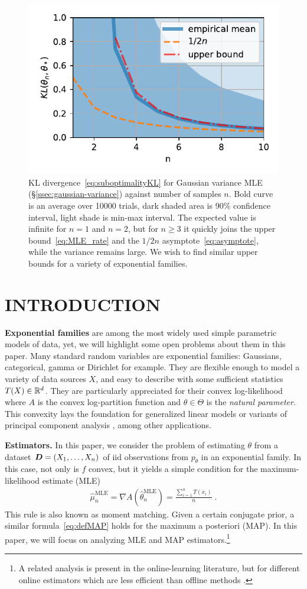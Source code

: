 \documentclass[twoside]{article}
\let\oldsection\section
\renewcommand{\section}[1]{\oldsection{\texorpdfstring{\uppercase{#1}}{#1}}}
\newcommand{\logpart}{A}
\newcommand{\nat}{\theta}
\newcommand{\lin}[1]{\left\langle#1\right\rangle}
\begin{document}
\begin{figure}[t]
	\centering
\includegraphics[width=.4\textwidth]{fewsamples.pdf}
	\caption{KL divergence~\eqref{eq:suboptimalityKL} for Gaussian variance MLE (\S\ref{ssec:gaussian-variance}) against number of samples $n$. Bold curve is an average over 10000 trials,  dark shaded area is 90\% confidence interval, light shade is min-max interval.
		The expected value is infinite for $n=1$ and $n=2$, but for $n\geq3$ it quickly joins the upper bound~\eqref{eq:MLE_rate} and the $1/2n$ asymptote~\eqref{eq:asymptote}, while the variance remains large.
		We wish to find similar upper bounds for a variety of exponential families.
	}
	\label{fig:curves}
\end{figure}


\section{Introduction}
\label{sec:motivation}

{\bf Exponential families} are among the most widely used simple parametric models of data, yet, we will highlight some open problems about them in this paper.
Many standard random variables are exponential families: Gaussians, categorical, gamma or Dirichlet for example.
They are flexible enough to model a variety of data sources $X$, and easy to describe with some sufficient statistics $T(X) \in \mathbb{R}^d$.
They are particularly appreciated for their convex log-likelihood
\alignn{
f(\nat) := \E[-\log p_\nat(X)] = \logpart(\nat) - \lin{\E[T(X)] , \nat},
\label{eq:defNLL}
}
where $\logpart$ is the convex log-partition function and $\nat\in\Theta$ is the \textit{natural parameter}.
This convexity lays the foundation for generalized linear models \citep{mccullagh1989generalized}
or variants of principal component analysis \citep{collins2001generalization}, among other applications.

{\bf Estimators.}
In this paper, we consider the problem of estimating $\nat$ from a dataset ${\bm{D}} = (X_1, \dots, X_n)$ of iid observations from $p_\theta$ in an exponential family.
In this case, not only is $f$ convex, but it yields a simple condition for the maximum-likelihood estimate (MLE)
\begin{align}
 \hat \mu_n^\text{MLE} = \nabla  \logpart(\hat \nat_n^\text{MLE}) = \frac{\sum_{i=1}^n T(x_i)}{n} \; .
	\label{eq:defMLE}
\end{align}
This rule is also known as moment matching.
Given a certain conjugate prior, a similar formula~\eqref{eq:defMAP} holds for the maximum a posteriori (MAP). In this paper, we will focus on analyzing MLE and MAP estimators.\footnote{A related analysis is present in the online-learning literature, but for different online estimators which are less efficient than offline methods \citep{azoury2001relative,dasgupta2007online}.}
\end{document}
